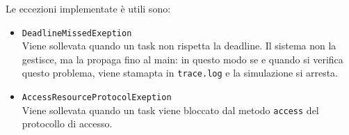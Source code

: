 \myskip

Le eccezioni implementate è utili sono:
\begin{itemize}
    \item \texttt{DeadlineMissedExeption} \\
        Viene sollevata quando un task non rispetta la deadline. Il sistema non la gestisce, ma la propaga fino al main: in questo modo se e quando si verifica questo problema, viene stamapta in \texttt{trace.log} e la simulazione si arresta.
    \item \texttt{AccessResourceProtocolExeption} \\
        Viene sollevata quando un task viene bloccato dal metodo \texttt{access} del protocollo di accesso.
\end{itemize}